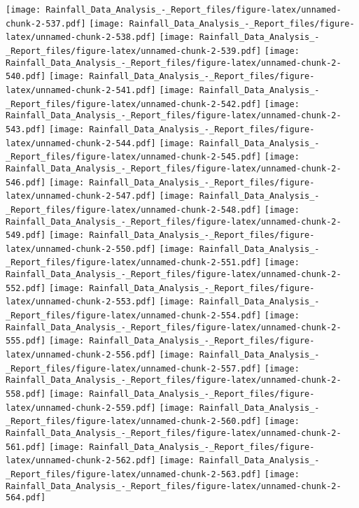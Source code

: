 \documentclass[
]{article}
\begin{document}
\texttt{[image: Rainfall\_Data\_Analysis\_-\_Report\_files/figure-latex/unnamed-chunk-2-537.pdf]}
\texttt{[image: Rainfall\_Data\_Analysis\_-\_Report\_files/figure-latex/unnamed-chunk-2-538.pdf]}
\texttt{[image: Rainfall\_Data\_Analysis\_-\_Report\_files/figure-latex/unnamed-chunk-2-539.pdf]}
\texttt{[image: Rainfall\_Data\_Analysis\_-\_Report\_files/figure-latex/unnamed-chunk-2-540.pdf]}
\texttt{[image: Rainfall\_Data\_Analysis\_-\_Report\_files/figure-latex/unnamed-chunk-2-541.pdf]}
\texttt{[image: Rainfall\_Data\_Analysis\_-\_Report\_files/figure-latex/unnamed-chunk-2-542.pdf]}
\texttt{[image: Rainfall\_Data\_Analysis\_-\_Report\_files/figure-latex/unnamed-chunk-2-543.pdf]}
\texttt{[image: Rainfall\_Data\_Analysis\_-\_Report\_files/figure-latex/unnamed-chunk-2-544.pdf]}
\texttt{[image: Rainfall\_Data\_Analysis\_-\_Report\_files/figure-latex/unnamed-chunk-2-545.pdf]}
\texttt{[image: Rainfall\_Data\_Analysis\_-\_Report\_files/figure-latex/unnamed-chunk-2-546.pdf]}
\texttt{[image: Rainfall\_Data\_Analysis\_-\_Report\_files/figure-latex/unnamed-chunk-2-547.pdf]}
\texttt{[image: Rainfall\_Data\_Analysis\_-\_Report\_files/figure-latex/unnamed-chunk-2-548.pdf]}
\texttt{[image: Rainfall\_Data\_Analysis\_-\_Report\_files/figure-latex/unnamed-chunk-2-549.pdf]}
\texttt{[image: Rainfall\_Data\_Analysis\_-\_Report\_files/figure-latex/unnamed-chunk-2-550.pdf]}
\texttt{[image: Rainfall\_Data\_Analysis\_-\_Report\_files/figure-latex/unnamed-chunk-2-551.pdf]}
\texttt{[image: Rainfall\_Data\_Analysis\_-\_Report\_files/figure-latex/unnamed-chunk-2-552.pdf]}
\texttt{[image: Rainfall\_Data\_Analysis\_-\_Report\_files/figure-latex/unnamed-chunk-2-553.pdf]}
\texttt{[image: Rainfall\_Data\_Analysis\_-\_Report\_files/figure-latex/unnamed-chunk-2-554.pdf]}
\texttt{[image: Rainfall\_Data\_Analysis\_-\_Report\_files/figure-latex/unnamed-chunk-2-555.pdf]}
\texttt{[image: Rainfall\_Data\_Analysis\_-\_Report\_files/figure-latex/unnamed-chunk-2-556.pdf]}
\texttt{[image: Rainfall\_Data\_Analysis\_-\_Report\_files/figure-latex/unnamed-chunk-2-557.pdf]}
\texttt{[image: Rainfall\_Data\_Analysis\_-\_Report\_files/figure-latex/unnamed-chunk-2-558.pdf]}
\texttt{[image: Rainfall\_Data\_Analysis\_-\_Report\_files/figure-latex/unnamed-chunk-2-559.pdf]}
\texttt{[image: Rainfall\_Data\_Analysis\_-\_Report\_files/figure-latex/unnamed-chunk-2-560.pdf]}
\texttt{[image: Rainfall\_Data\_Analysis\_-\_Report\_files/figure-latex/unnamed-chunk-2-561.pdf]}
\texttt{[image: Rainfall\_Data\_Analysis\_-\_Report\_files/figure-latex/unnamed-chunk-2-562.pdf]}
\texttt{[image: Rainfall\_Data\_Analysis\_-\_Report\_files/figure-latex/unnamed-chunk-2-563.pdf]}
\texttt{[image: Rainfall\_Data\_Analysis\_-\_Report\_files/figure-latex/unnamed-chunk-2-564.pdf]}
\end{document}
